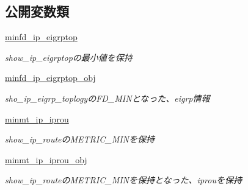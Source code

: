 \subsection*{公開変数類}
\begin{DoxyCompactItemize}
\item 
\mbox{\label{classCiscoConf_1_1CiscoRoute_a927b3c07671d34b8bc5b2d0e056d5ab8}} 
\mbox{\hyperlink{classCiscoConf_1_1CiscoRoute_a927b3c07671d34b8bc5b2d0e056d5ab8}{minfd\+\_\+ip\+\_\+eigrptop}}
\begin{DoxyCompactList}\small\item\em show\+\_\+ip\+\_\+eigrptopの最小値を保持 \end{DoxyCompactList}\item 
\mbox{\label{classCiscoConf_1_1CiscoRoute_aef8fdb45e28202bb3871a41aff7b4ccd}} 
\mbox{\hyperlink{classCiscoConf_1_1CiscoRoute_aef8fdb45e28202bb3871a41aff7b4ccd}{minfd\+\_\+ip\+\_\+eigrptop\+\_\+obj}}
\begin{DoxyCompactList}\small\item\em sho\+\_\+ip\+\_\+eigrp\+\_\+toplogyの\+F\+D\+\_\+\+M\+I\+Nとなった、eigrp情報 \end{DoxyCompactList}\item 
\mbox{\label{classCiscoConf_1_1CiscoRoute_a399a3f4295c8fc69ac0be44cf07fc480}} 
\mbox{\hyperlink{classCiscoConf_1_1CiscoRoute_a399a3f4295c8fc69ac0be44cf07fc480}{minmt\+\_\+ip\+\_\+iprou}}
\begin{DoxyCompactList}\small\item\em show\+\_\+ip\+\_\+routeの\+M\+E\+T\+R\+I\+C\+\_\+\+M\+I\+Nを保持 \end{DoxyCompactList}\item 
\mbox{\label{classCiscoConf_1_1CiscoRoute_a5df17a420283265968432f6ded6a6853}} 
\mbox{\hyperlink{classCiscoConf_1_1CiscoRoute_a5df17a420283265968432f6ded6a6853}{minmt\+\_\+ip\+\_\+iprou\+\_\+obj}}
\begin{DoxyCompactList}\small\item\em show\+\_\+ip\+\_\+routeの\+M\+E\+T\+R\+I\+C\+\_\+\+M\+I\+Nを保持となった、iprouを保持 \end{DoxyCompactList}\item 
\mbox{\label{classCiscoConf_1_1CiscoRoute_a8970f6863dda18ba44dea9d51f04580a}} 

\end{DoxyCompactItemize}
